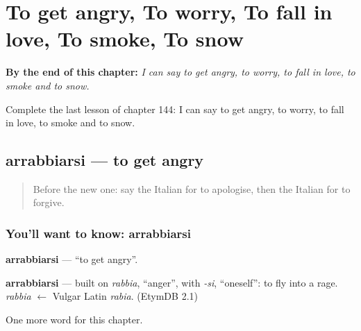 
\chapter{To get angry, To worry, To fall in love, To smoke, To snow}
\label{ch:it-to-get-angry-to-worry-to-fall-in-love-to-smoke-to-snow}

\begin{chapteropening}
\textbf{By the end of this chapter:} \emph{I can say to get angry, to worry, to fall in love, to smoke and to snow.}

Complete the last lesson of chapter 144: I can say to get angry, to worry, to fall in love, to smoke and to snow.
\end{chapteropening}

\section[arrabbiarsi]{arrabbiarsi — to get angry}

\label{lesson:IT-C144-arrabbiarsi}



\begin{quote}
Before the new one: say the Italian for to apologise, then the Italian for to forgive.
\end{quote}

\subsection*{You'll want to know: arrabbiarsi}
\textbf{arrabbiarsi} — \textquotedblleft{}to get angry\textquotedblright{}.

\begin{cousinweb}
\textbf{arrabbiarsi} — built on \emph{rabbia}, \textquotedblleft{}anger\textquotedblright{}, with \emph{-si}, \textquotedblleft{}oneself\textquotedblright{}: to fly into a rage. \emph{rabbia} $\leftarrow$ Vulgar Latin \emph{rabia}. (EtymDB 2.1)
\end{cousinweb}

\begin{grammarlens}[title={What you've built}]
One more word for this chapter.
\end{grammarlens}

